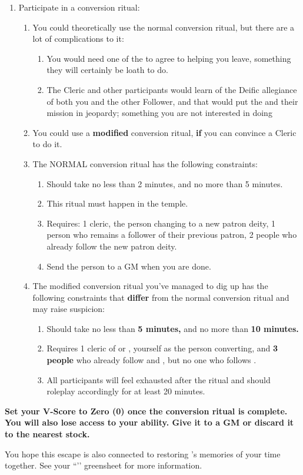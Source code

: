 \documentclass[green]{GL2020}
\begin{document}
\begin{enumerate}
  \item Participate in a conversion ritual:
  \begin{enumerate}
    \item You could theoretically use the normal conversion ritual, but there are a lot of complications to it:
    \begin{enumerate}
      \item You would need one of the \pGoaties{} to agree to helping you leave, something they will certainly be loath to do.
      \item The Cleric and other participants would learn of the Deific allegiance of both you and the other Follower, and that would put the \pGoaties{} and their mission in jeopardy; something you are not interested in doing
    \end{enumerate}

    \item You could use a \textbf{modified} conversion ritual, \textbf{if} you can convince a Cleric to do it. 
     \item The NORMAL conversion ritual has the following constraints: 
  \begin{enumerate}
    \item Should take no less than 2 minutes, and no more than 5 minutes.
    \item This ritual must happen in the temple.
    \item Requires: 1 cleric, the person changing to a new patron deity, 1 person who remains a follower of their previous patron, 2 people who already follow the new patron deity.
	\item Send the person to a GM when you are done.
  \end{enumerate}
     \item The modified conversion ritual you’ve managed to dig up has the following constraints that \textbf{differ} from the normal conversion ritual and may raise suspicion:
    \begin{enumerate}
\item Should take no less than \textbf{5 minutes,} and no more than \textbf{10 minutes.} 
\item Requires 1 cleric of \cEbb{} or \cFlow{}, yourself as the person converting, and \textbf{3 people} who already follow \cEbb{} and \cFlow{}, but no one who follows \cGenesis{}.
      \item All participants will feel exhausted after the ritual and should roleplay accordingly for at least 20 minutes.
    \end{enumerate}
  \end{enumerate}
\end{enumerate}

\textbf{Set your V-Score to Zero (0) once the conversion ritual is complete. You will also lose access to your \aLuck{} ability. Give it to a GM or discard it to the nearest stock.}

You hope this escape is also connected to restoring \cHeadScientist{}’s memories of your time together. See your ``\gRestoringLove{}’’ greensheet for more information.
\end{document}

